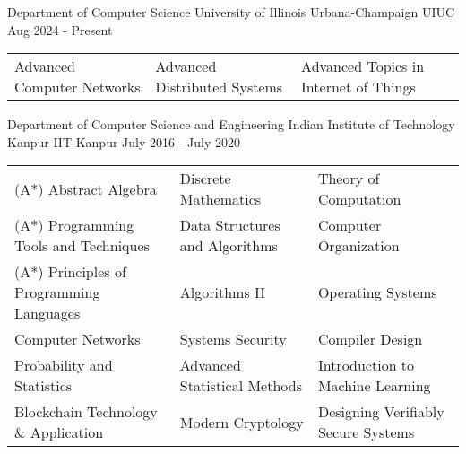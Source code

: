 

\begin{cventries}

\extraentry
  {Department of Computer Science}
  {University of Illinois Urbana-Champaign}
  {UIUC}
  {Aug 2024 - Present}
{\vspace*{-\baselineskip}\vspace*{-\baselineskip}\fontsize{9.5pt}{1.5em}\bodyfontlight\upshape\color{text}
  \setlength\extrarowheight{-3pt}
  \begin{tabular*}{\textwidth}{L{\textwidth/3} L{\textwidth/3} L{\textwidth/3}}
    Advanced Computer Networks & Advanced Distributed Systems & Advanced Topics in Internet of Things \\
\end{tabular*}}


\extraentry
  {Department of Computer Science and Engineering}
  {Indian Institute of Technology Kanpur}
  {IIT Kanpur}
  {July 2016 - July 2020}
{\vspace*{-\baselineskip}\fontsize{9.5pt}{1.5em}\bodyfontlight\upshape\color{text}
  \setlength\extrarowheight{-3pt}
  \begin{tabular*}{\textwidth}{L{\textwidth/3} L{\textwidth/3} L{\textwidth/3}}
    (A$*$) Abstract Algebra & Discrete Mathematics & Theory of Computation \\
    (A$*$) Programming Tools and Techniques & Data Structures and Algorithms & Computer Organization \\
    (A$*$) Principles of Programming Languages & Algorithms II & Operating Systems \\
    Computer Networks & Systems Security & Compiler Design \\
    Probability and Statistics & Advanced Statistical Methods & Introduction to Machine Learning \\
    Blockchain Technology \& Application & Modern Cryptology & Designing Verifiably Secure Systems \\ %
\end{tabular*}}

\end{cventries}

\vspace{0.5em}